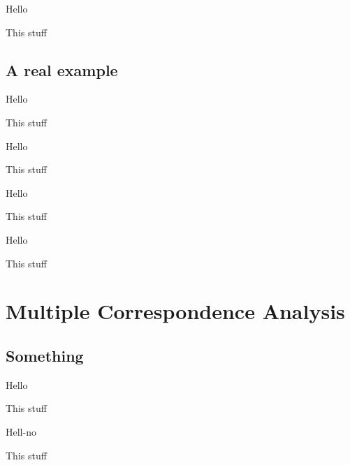 \documentclass[
  ignorenonframetext,
]{beamer}
\begin{document}
\begin{frame}{Hello}
\protect\hypertarget{hello-4}{}

This stuff

\end{frame}

\hypertarget{a-real-example}{%
\subsection{A real example}\label{a-real-example}}

\begin{frame}{Hello}
\protect\hypertarget{hello-5}{}

This stuff

\end{frame}

\begin{frame}{Hello}
\protect\hypertarget{hello-6}{}

This stuff

\end{frame}

\begin{frame}{Hello}
\protect\hypertarget{hello-7}{}

This stuff

\end{frame}

\begin{frame}{Hello}
\protect\hypertarget{hello-8}{}

This stuff

\end{frame}

\hypertarget{multiple-correspondence-analysis}{%
\section{Multiple Correspondence
Analysis}\label{multiple-correspondence-analysis}}

\hypertarget{something-1}{%
\subsection{Something}\label{something-1}}

\begin{frame}{Hello}
\protect\hypertarget{hello-9}{}

This stuff

\end{frame}

\begin{frame}{Hell-no}
\protect\hypertarget{hell-no-1}{}

This stuff

\end{frame}
\end{document}
